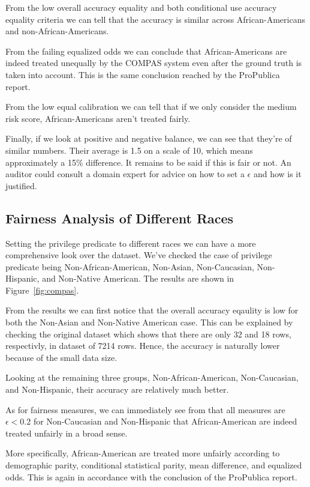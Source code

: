 \documentclass[conference]{IEEEtran}
\begin{document}
From the low overall accuracy equality and both conditional use accuracy equality criteria we can tell that the accuracy is similar across African-Americans and non-African-Americans.

From the failing equalized odds we can conclude that African-Americans are indeed treated unequally by the COMPAS system even after the ground truth is taken into account. This is the same conclusion reached by the ProPublica report.

From the low equal calibration we can tell that if we only consider the medium risk score, African-Americans aren't treated fairly.

Finally, if we look at positive and negative balance, we can see that they're of similar numbers. Their average is 1.5 on a scale of 10, which means approximately a 15\% difference. It remains to be said if this is fair or not. An auditor could consult a domain expert for advice on how to set a $\epsilon$ and how is it justified.

\subsection{Fairness Analysis of Different Races}
Setting the privilege predicate to different races we can have a more comprehensive look over the dataset. We've checked the case of privilege predicate being Non-African-American, Non-Asian, Non-Caucasian, Non-Hispanic, and Non-Native American. The results are shown in Figure~\ref{fig:compas}.

From the results we can first notice that the overall accuracy eqaulity is low for both the Non-Asian and Non-Native American case. This can be explained by checking the original dataset which shows that there are only 32 and 18 rows, respectivly, in dataset of 7214 rows. Hence, the accuracy is naturally lower because of the small data size.

Looking at the remaining three groups, Non-African-American, Non-Caucasian, and Non-Hispanic, their accuracy are relatively much better.

As for fairness measures, we can immediately see from that all measures are $\epsilon < 0.2$ for Non-Caucasian and Non-Hispanic that African-American are indeed treated unfairly in a broad sense.

More specifically, African-American are treated more unfairly according to demographic parity, conditional statistical parity, mean difference, and equalized odds. This is again in accordance with the conclusion of the ProPublica report.
\end{document}
